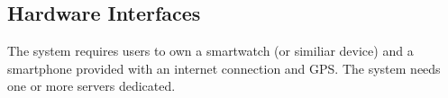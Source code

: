 \subsection{Hardware Interfaces}
The system requires users to own a smartwatch (or similiar device) and a smartphone provided with an internet connection and GPS.
The system needs one or more servers dedicated.
